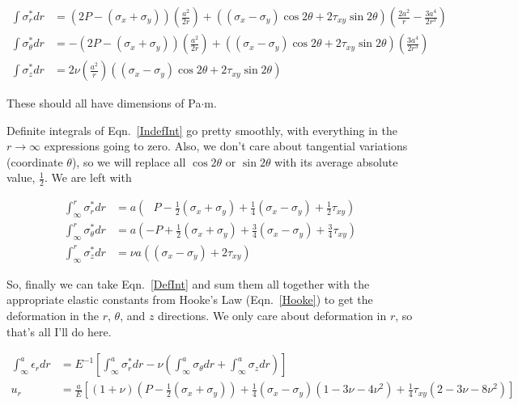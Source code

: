 \documentclass[11pt]{article}
\begin{document}
\begin{equation}
	\begin{aligned}
	\int \sigma^*_r dr &= \left( 2P - (\sigma_x+\sigma_y)  \right) \left( \frac{a^2}{2r} \right) + \left( (\sigma_x-\sigma_y) \cos2\theta + 2 \tau_{xy}\sin2\theta \right) \left( \frac{2a^2}{r} - \frac{3a^4}{2r^3} \right) \\
	\int \sigma^*_\theta dr &=  - \left( 2P - (\sigma_x+\sigma_y)  \right) \left( \frac{a^2}{2r} \right) + \left( (\sigma_x-\sigma_y) \cos2\theta + 2 \tau_{xy}\sin2\theta \right) \left(  \frac{3a^4}{2r^3} \right)  \\
	\int \sigma^*_z dr &= 2 \nu \left( \frac{a^2}{r} \right) \left( \left(\sigma_x-\sigma_y\right)\cos2\theta+2\tau_{xy}\sin2\theta\right)
	\end{aligned}
\label{IndefInt}
\end{equation}

\noindent These should all have dimensions of Pa$\cdot$m.

Definite integrals of Eqn.~\ref{IndefInt} go pretty smoothly, with everything in the $r\rightarrow\infty$ expressions going to zero.  Also, we don't care about tangential variations (coordinate $\theta$), so we will replace all $\cos2\theta$ or $\sin2\theta$ with its average absolute value, $\frac{1}{2}$.  We are left with

\begin{equation}
	\begin{aligned}
	\int_\infty^r \sigma^*_r dr &=a \left(~~~P - \frac{1}{2} (\sigma_x + \sigma_y) + \frac{1}{4} (\sigma_x - \sigma_y)  + \frac{1}{2} \tau_{xy} \right) \\
	\int_\infty^r \sigma^*_\theta dr &= a \left(-P + \frac{1}{2} (\sigma_x + \sigma_y) + \frac{3}{4} (\sigma_x - \sigma_y)  + \frac{3}{4} \tau_{xy} \right) \\
	\int_\infty^r \sigma^*_z dr &= \nu a \left( \left(\sigma_x-\sigma_y\right) + 2 \tau_{xy}\right)
	\end{aligned}
\label{DefInt}
\end{equation}

So, finally we can take Eqn.~\ref{DefInt} and sum them all together with the appropriate elastic constants from Hooke's Law (Eqn.~\ref{Hooke}) to get the deformation in the $r$, $\theta$, and $z$ directions.  We only care about deformation in $r$, so that's all I'll do here.

\begin{equation}
	\begin{aligned}
	\int_\infty^a\epsilon_r dr &= E^{-1}\left[ \int_\infty^a \sigma^*_r dr - \nu\left( \int_\infty^a \sigma_\theta dr + \int_\infty^a \sigma_z dr \right)\right] \\
	u_r &=  \frac{a}{E} \left[ ( 1 + \nu ) \left( P - \frac{1}{2} (\sigma_x + \sigma_y) \right) + \frac{1}{4} (\sigma_x - \sigma_y) (1 - 3 \nu - 4 \nu^2) +   \frac{1}{4} \tau_{xy} (2 - 3 \nu - 8 \nu^2)\right]
	\end{aligned}
\label{DefVec}
\end{equation}
\end{document}
